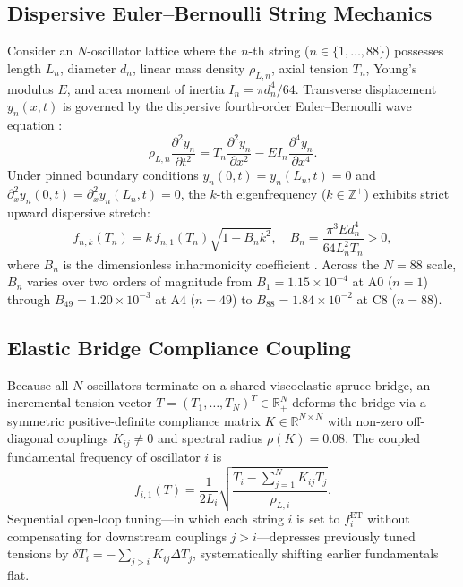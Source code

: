 \documentclass[aps,prl,twocolumn,superscriptaddress,10pt]{revtex4-2}
\begin{document}
\subsection{Dispersive Euler--Bernoulli String Mechanics}

Consider an $N$-oscillator lattice where the $n$-th string ($n \in \{1,\dots,88\}$) possesses length $L_n$, diameter $d_n$, linear mass density $\rho_{L,n}$, axial tension $T_n$, Young's modulus $E$, and area moment of inertia $I_n = \pi d_n^4 / 64$. Transverse displacement $y_n(x,t)$ is governed by the dispersive fourth-order Euler--Bernoulli wave equation \cite{Fletcher1964}:
\begin{equation}
\rho_{L,n} \frac{\partial^2 y_n}{\partial t^2} = T_n \frac{\partial^2 y_n}{\partial x^2} - E I_n \frac{\partial^4 y_n}{\partial x^4}.
\label{eq:euler_bernoulli}
\end{equation}
Under pinned boundary conditions $y_n(0,t) = y_n(L_n,t) = 0$ and $\partial_x^2 y_n(0,t) = \partial_x^2 y_n(L_n,t) = 0$, the $k$-th eigenfrequency ($k \in \mathbb{Z}^+$) exhibits strict upward dispersive stretch:
\begin{equation}
f_{n,k}(T_n) = k \, f_{n,1}(T_n) \sqrt{1 + B_n k^2}, \quad B_n = \frac{\pi^3 E d_n^4}{64 L_n^2 T_n} > 0,
\label{eq:stretched_partials}
\end{equation}
where $B_n$ is the dimensionless inharmonicity coefficient \cite{Young1952,Conklin1996}. Across the $N=88$ scale, $B_n$ varies over two orders of magnitude from $B_1 = 1.15 \times 10^{-4}$ at $\text{A0}$ ($n=1$) through $B_{49} = 1.20 \times 10^{-3}$ at $\text{A4}$ ($n=49$) to $B_{88} = 1.84 \times 10^{-2}$ at $\text{C8}$ ($n=88$).

\subsection{Elastic Bridge Compliance Coupling}

Because all $N$ oscillators terminate on a shared viscoelastic spruce bridge, an incremental tension vector $T = (T_1,\dots,T_N)^T \in \mathbb{R}_+^N$ deforms the bridge via a symmetric positive-definite compliance matrix $K \in \mathbb{R}^{N\times N}$ with non-zero off-diagonal couplings $K_{ij} \neq 0$ and spectral radius $\rho(K) = 0.08$. The coupled fundamental frequency of oscillator $i$ is
\begin{equation}
f_{i,1}(T) = \frac{1}{2 L_i} \sqrt{\frac{T_i - \sum_{j=1}^N K_{ij} T_j}{\rho_{L,i}}}.
\label{eq:bridge_coupling}
\end{equation}
Sequential open-loop tuning---in which each string $i$ is set to $f_i^{\text{ET}}$ without compensating for downstream couplings $j > i$---depresses previously tuned tensions by $\delta T_i = -\sum_{j > i} K_{ij} \Delta T_j$, systematically shifting earlier fundamentals flat.
\end{document}
